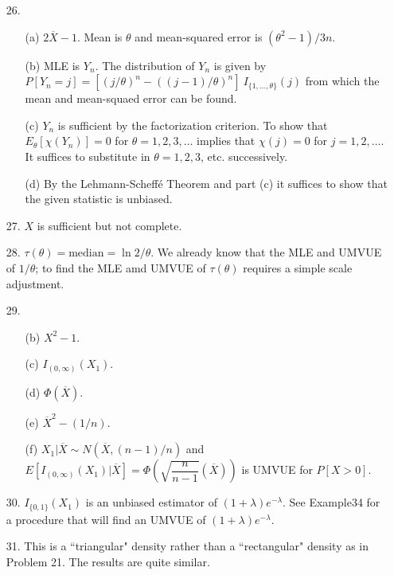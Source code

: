 \begin{enumerate}
	 \item[26.] \begin{enumerate}
	 	\item[(a)] $2\overline{X}-1$. Mean is $\theta$ and mean-squared error is $(\theta^2-1)/3n$.
	 	\item[(b)] MLE is $Y_n$. The distribution of $Y_n$ is given by $P[Y_n=j] = [(j/\theta)^n - ((j-1)/\theta)^n]\ I_{\{1,\ldots,\theta\}}(j)$ from which the mean and mean-squaed error can be found.
	 	\item[(c)] $Y_n$ is sufficient by the factorization criterion. To show that $E_\theta[\chi(Y_n)] = 0$ for $\theta = 1, 2, 3, \ldots$ implies that $\chi(j)=0$ for $j=1,2,\ldots$. It suffices to substitute in $\theta = 1, 2, 3$, etc. successively.
	 	\item[(d)] By the Lehmann-Scheff\'e Theorem and part (c) it suffices to show that the given statistic is unbiased.
	 \end{enumerate}
 
 	\item[27.] $X$ is sufficient but not complete.

	\item[28.] $\tau(\theta) = \mbox{median} = \ln 2/\theta$. We already know that the MLE and UMVUE of $1/\theta$; to find the MLE amd UMVUE of $\tau(\theta)$ requires a simple scale adjustment.	  
	  
	\item[29.] \begin{enumerate}
		\item[(b)] $X^2 - 1$.
		\item[(c)] $I_{(0,\infty)}(X_1)$.
		
		\newpage
		
		\item[(d)] $\Phi(\overline{X})$.
		\item[(e)] $\overline{X}^2 - (1/n)$.
		\item[(f)] $X_1\vert\overline{X} \sim N(\overline{X},(n-1)/n)$ and $E[I_{(0,\infty)}(X_1)\vert \overline{X}] = \Phi\left(\sqrt{\dfrac{n}{n-1}}(\overline{X})\right)$ is UMVUE for $P[X>0]$.
	\end{enumerate} 
	  
	\item[30.] $I_{\{0,1\}}(X_1)$ is an unbiased estimator of $(1+\lambda)e^{-\lambda}$.  See Example34 for a procedure that will find an UMVUE of $(1+\lambda)e^{-\lambda}$.
	
	\item[31.] This is a ``triangular" density rather than a ``rectangular" density as in Problem 21.  The results are quite similar.  
	  

\end{enumerate}
